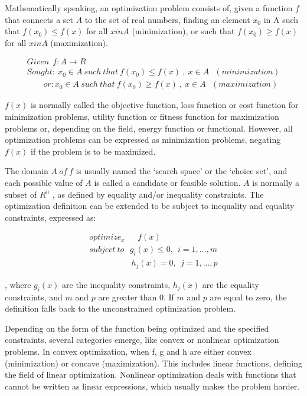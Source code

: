 Mathematically speaking, an optimization problem consists of, given a function $ f $ that connects a set $ A $ to the set of real numbers, finding an element $ x_{0} $ in A such that $ f(x_{0}) \leq f(x) $ for all $ x in A $  (minimization), or such that $ f(x_{0}) \geq f(x) $ for all $ x in A $ (maximization).

\begin{align}
	Given ~~ f:A \rightarrow R \nonumber \\
	Sought: ~ x_{0} \in A ~ such ~ that ~ f(x_{0})  \leq f(x) ~,~x \in A ~~~ ( minimization ) \nonumber \\
	~~~~~~~~~ or: x_{0} \in A ~ such ~ that ~ f(x_{0})  \geq f(x) ~,~x \in A ~~~ ( maximization )
\end{align}

$ f(x) $  is normally called the objective function, loss function or cost function for minimization problems, utility function or fitness function for maximization problems or, depending on the field, energy function or functional. However, all optimization problems can be expressed as minimization problems, negating  $ f(x) $  if the problem is to be maximized.

The domain  $ A ~ of ~ f $ is usually named the ‘search space’ or the ‘choice set’, and each possible value of  $ A $  is called a candidate or feasible solution.  $ A $  is normally a subset of  $ R^{n} $ , as defined by equality and/or inequality constraints. The optimization definition can be extended to be subject to inequality and equality constraints, expressed as:

\begin{align}
	optimize_{x}~~~~~~~ f(x) \nonumber \\
	subject~to~~~  g_{i}(x)  \leq 0,~~ i=1,  \ldots ,m \nonumber \\
	~~~~~~~~~~~~~~~~~~~~~~~ h_{j}(x) =0,~~ j=1,  \ldots ,p
\end{align}

, where  \( g_{i}(x)  \)  are the inequality constraints,  \( h_{j}(x)  \)  are the equality constraints, and  \( m \)  and  \( p \)  are greater than 0. If  \( m \)  and  \( p \)  are equal to zero, the definition falls back to the unconstrained optimization problem.

Depending on the form of the function being optimized and the specified constraints, several categories emerge, like convex or nonlinear optimization problems. In convex optimization, when f, g and h are either convex (minimization) or concave (maximization). This includes linear functions, defining the field of linear optimization. Nonlinear optimization deals with functions that cannot be written as linear expressions, which usually makes the problem harder.

